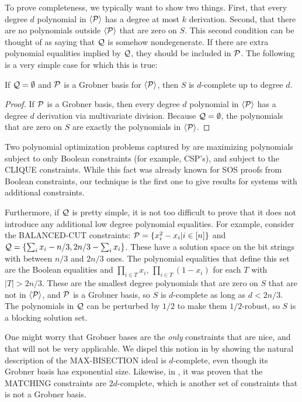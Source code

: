To prove completeness, we typically want to show two things. First, that every degree $d$ polynomial in $\langle \mathcal P\rangle$ has a degree at most $k$ derivation. Second, that there are no polynomials outside $\langle \mathcal P\rangle$ that are zero on $S$. This second condition can be thought of as saying that $\mathcal Q$ is somehow nondegenerate. If there are extra polynomial equalities implied by $\mathcal Q$, they should be included in $\mathcal P$. The following is a very simple case for which this is true:
\begin{lemma}\label{lem:grobner}
If $\mathcal Q = \emptyset$ and $\mathcal P$ is a Grobner basis for $\langle \mathcal P\rangle$, then $S$ is $d$-complete up to degree $d$. 
\end{lemma}
\begin{proof}
If $\mathcal P$ is a Grobner basis, then every degree $d$ polynomial in $\langle \mathcal P\rangle$ has a degree $d$ derivation via multivariate division. Because $\mathcal Q = \emptyset$, the polynomials that are zero on $S$ are exactly the polynomials in $\langle \mathcal P\rangle$. 
\end{proof}
Two polynomial optimization problems captured by  are maximizing polynomials subject to only Boolean constraints (for example, CSP's), and subject to the CLIQUE constraints. While this fact was already known for SOS proofs from Boolean constraints, our technique is the first one to give results for systems with additional constraints. 

Furthermore, if $\mathcal Q$ is pretty simple, it is not too difficult to prove that it does not introduce any additional low degree polynomial equalities. For example, consider the BALANCED-CUT constraints: $\mathcal P = \{x_i^2-x_i | i \in [n]\}$ and $\mathcal Q = \{\sum_i x_i - n/3, 2n/3 - \sum_i x_i\}$. These have a solution space on the bit strings with between $n/3$ and $2n/3$ ones. The polynomial equalities that define this set are the Boolean equalities and $\prod_{i \in T} x_i$, $\prod_{i \in T} (1-x_i)$ for each $T$ with $|T| > 2n/3$. These are the smallest degree polynomials that are zero on $S$ that are not in $\langle \mathcal P\rangle$, and $\mathcal P$ is a Grobner basis, so $S$ is $d$-complete as long as $d < 2n/3$. The polynomials in $\mathcal Q$ can be perturbed by $1/2$ to make them $1/2$-robust, so $S$ is a blocking solution set. 

One might worry that Grobner bases are the \emph{only} constraints that are nice, and that  will not be very applicable. We dispel this notion in  by showing the natural description of the MAX-BISECTION ideal is $d$-complete, even though its Grobner basis has exponential size. Likewise, in \cite{}, it was proven that the MATCHING constraints are $2d$-complete, which is another set of constraints that is not a Grobner basis. 

